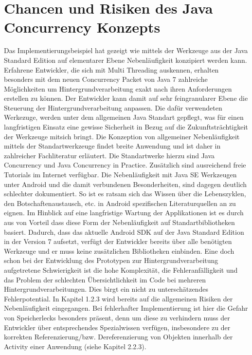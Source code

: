 \documentclass[12pt,oneside,a4paper,bibtotoc,liststotoc]{scrreprt}
\begin{document}
\section{Chancen und Risiken des Java Concurrency Konzepts}
Das Implementierungsbeispiel hat gezeigt wie mittels der Werkzeuge aus der Java Standard Edition auf elementarer Ebene Nebenläufigkeit konzipiert werden kann. Erfahrene Entwickler, die sich mit Multi Threading auskennen, erhalten besonders mit dem neuen Concurrency Packet von Java 7 zahlreiche Möglichkeiten um Hintergrundverarbeitung exakt nach ihren Anforderungen erstellen zu können. Der Entwickler kann damit auf sehr feingranularer Ebene die Steuerung der Hintergrundverarbeitung anpassen. Die dafür verwendeten Werkezuge, werden unter dem allgemeinen Java Standart gepflegt, was für einen langfristigen Einsatz eine gewisse Sicherheit in Bezug auf die Zukunftsträchtigkeit der Werkzeuge mitsich bringt. Die Konzeption von allgemeiner Nebenläufigkeit mittels der Standartwerkzeuge findet breite Anwendung und ist daher in zahlreicher Fachliteratur erläutert. Die Standartwerke hierzu sind Java Concurrency und Java Concurrency in Practice.  Zusätzlich sind ausreichend freie Tutorials im Internet verfügbar. Die Nebenläufigkeit mit Java SE Werkzeugen unter Android und die damit verbundenen Besonderheiten, sind dagegen deutlich schlechter dokumentiert. So ist es ratsam sich das Wissen über die Lebenszyklen, den Botschaftenaustausch, etc. in Android spezifischen Literaturquellen an zu eignen.
Im Hinblick auf eine langfristige Wartung der Applikationen ist es durch aus von Vorteil dass diese Form der Nebenläufigkeit auf Standartbibliotheken basiert. Dadurch, dass das aktuelle Android SDK auf der Java Standard Edition in der Version 7 aufsetzt, verfügt der Entwickler bereits über alle benötigten Werkzeuge und er muss keine zusätzlichen Bibliotheken einbinden.
Eine doch schon bei der Entwicklung des Prototypen zur Hintergrundverarbeitung aufgetretene Schwierigkeit ist die hohe Komplexität, die Fehleranfälligkeit und das Problem der schlechten Übersichtlichkeit im Code bei mehreren Hintergrundverarbeitungen. Dies birgt ein nicht zu unterschätzendes Fehlerpotential. In Kapitel 1.2.3 wird bereits auf die allgemeinen Risiken der Nebenläufigkeit eingegangen. Bei fehlerhafter Implementierung ist hier die Gefahr von Speicherlecks besonders präsent, denn um diese zu verhindern muss der Entwickler über entsprechendes Spezialwissen verfügen, insbesondere zu der korrekten Referenzierung/bzw. Dereferenzierung von Objekten innerhalb der Activity einer Anwendung (siehe Kapitel 2.2.3).
\end{document}

